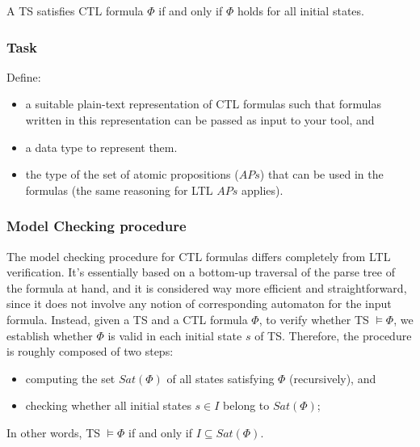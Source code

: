 \documentclass{article}
\begin{document}
A TS satisfies CTL formula $\Phi$ if and only if $\Phi$ holds for all initial states.

\subsubsection*{Task}
Define:
\begin{itemize}
    \item a suitable plain-text representation of CTL formulas such that formulas written in this representation can be passed as input to your tool, and 
    \item a data type to represent them.
    \item the type of the set of atomic propositions ($APs$) that can be used in the formulas (the same reasoning for LTL $APs$ applies).
\end{itemize}


\subsubsection*{Model Checking procedure}
The model checking procedure for CTL formulas differs completely from LTL verification. 
It's essentially based on a bottom-up traversal of the parse tree of the formula at hand, 
and it is considered way more efficient and straightforward, since it does not involve any notion of 
corresponding automaton for the input formula. Instead, given a TS and a CTL formula $\Phi$, to verify 
whether TS $\vDash \Phi$, we establish whether $\Phi$ is valid in each initial state $s$ of TS. 
Therefore, the procedure is roughly composed of two steps: 
\begin{itemize}
    \item computing the set $Sat(\Phi)$ of all states satisfying $\Phi$ (recursively), and
    \item checking whether all initial states $s \in I$ belong to $Sat(\Phi)$; 
\end{itemize}
In other words, TS $\vDash \Phi$ if and only if $I \subseteq Sat(\Phi)$.
\end{document}
